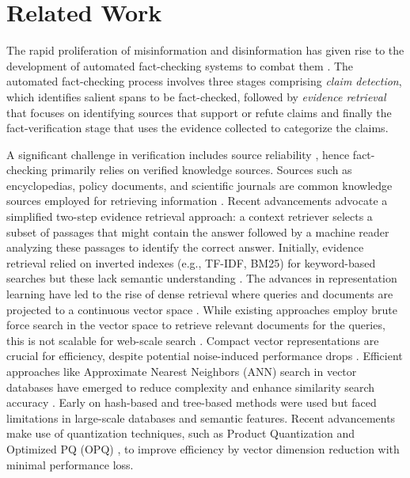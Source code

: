 \vspace{-1em}
\section{Related Work}
\vspace{-1em}
The rapid proliferation of misinformation and disinformation has given rise to the development of automated fact-checking systems to combat them \cite{thorne2018fever,programfc,guo2022survey,v2024quantemprealworldopendomainbenchmark,questgen}. The automated fact-checking process involves three stages comprising \textit{claim detection}, which identifies salient spans to be fact-checked, 
followed by \textit{evidence retrieval} that focuses on identifying sources that support or refute claims and finally the fact-verification stage that uses the evidence collected to categorize the claims.

A significant challenge in verification includes source reliability \cite{guo2022survey}, hence fact-checking primarily relies on verified knowledge sources. Sources such as encyclopedias, policy documents, and scientific journals are common knowledge sources employed for retrieving information \cite{Lazarski2021nlpfact, thorne2018automated}. Recent advancements advocate a simplified two-step evidence retrieval approach: a context retriever selects a subset of passages that might contain the answer followed by a machine reader analyzing these passages to identify the correct answer. Initially, evidence retrieval relied on inverted indexes (e.g., TF-IDF, BM25) for keyword-based searches but these lack semantic understanding \cite{baranchuk2018revisiting, wei2022}. The advances in representation learning have led to the rise of dense retrieval where queries and documents are projected to a continuous vector space  \cite{karpukhin2020dense, zhao2022,Guo_2022}. While existing approaches employ brute force search in the vector space to retrieve relevant documents for the queries, this is not scalable for web-scale search \cite{bondarenko2021understanding, zhu2023survey, han2023comprehensive, wei2022,tas_b}. Compact vector representations are crucial for efficiency, despite potential noise-induced performance drops \cite{zhan2021jointly}. Efficient approaches like Approximate Nearest Neighbors (ANN) search in vector databases have emerged to reduce complexity and enhance similarity search accuracy \cite{han2023comprehensive, wei2022, zhao2023ann}. Early on hash-based and tree-based methods were used but faced limitations in large-scale databases and semantic features. Recent advancements make use of quantization techniques, such as Product Quantization\cite{jegou2011pq} and Optimized PQ (OPQ) \cite{ge2014opq}, to improve efficiency by vector dimension reduction with minimal performance loss.

